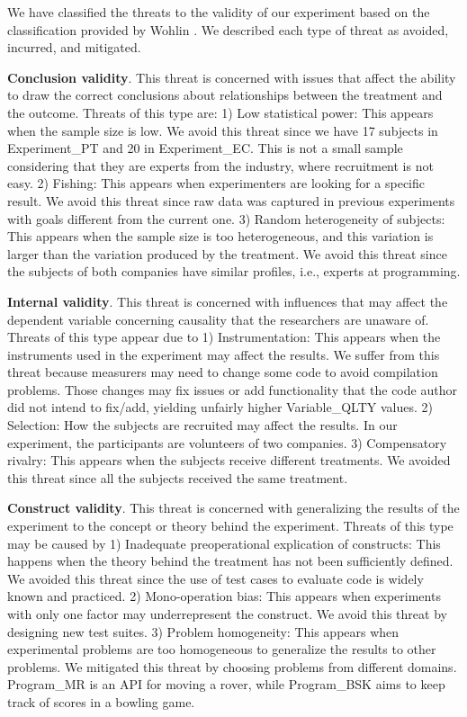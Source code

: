 We have classified the threats to the validity of our experiment based on the classification provided by Wohlin \cite{wohlin.2012}. We described each type of threat as avoided, incurred, and mitigated.

\textbf{Conclusion validity}. This threat is concerned with issues that affect the ability to draw the correct conclusions about relationships between the treatment and the outcome. Threats of this type are: 1) Low statistical power: This appears when the sample size is low. We avoid this threat since we have 17 subjects in Experiment\_PT and 20 in Experiment\_EC. This is not a small sample considering that they are experts from the industry, where recruitment is not easy. 2) Fishing: This appears when experimenters are looking for a specific result. We avoid this threat since raw data was captured in previous experiments with goals different from the current one. 3) Random heterogeneity of subjects: This appears when the sample size is too heterogeneous, and this variation is larger than the variation produced by the treatment. We avoid this threat since the subjects of both companies have similar profiles, i.e., experts at programming.

\textbf{Internal validity}. This threat is concerned with influences that may affect the dependent variable concerning causality that the researchers are unaware of. Threats of this type appear due to 
1) Instrumentation: This appears when the instruments used in the experiment may affect the results. We suffer from this threat because measurers may need to change some code to avoid compilation problems. Those changes may fix issues or add functionality that the code author did not intend to fix/add, yielding unfairly higher Variable\_QLTY values. 
2) Selection: How the subjects are recruited may affect the results. In our experiment, the participants are volunteers of two companies. 3) Compensatory rivalry: This appears when the subjects receive different treatments. We avoided this threat since all the subjects received the same treatment.

\textbf{Construct validity}. This threat is concerned with generalizing the results of the experiment to the concept or theory behind the experiment. Threats of this type may be caused by 1) Inadequate preoperational explication of constructs: This happens when the theory behind the treatment has not been sufficiently defined. We avoided this threat since the use of test cases to evaluate code is widely known and practiced. 2) Mono-operation bias: This appears when experiments with only one factor may underrepresent the construct. We avoid this threat by designing new test suites. 3) Problem homogeneity: This appears when experimental problems are too homogeneous to generalize the results to other problems. We mitigated this threat by choosing problems from different domains. Program\_MR is an API for moving a rover, while Program\_BSK aims to keep track of scores in a bowling game.

